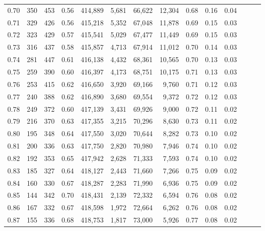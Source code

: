 \begin{tabular}{rrrrrrrrrrrrrr}
0.70 &     350 &    453 &  0.56 &  414,889 &    5,681 &  66,622 &  12,304 &  0.68 &  0.16 &      0.04 \\
0.71 &     329 &    426 &  0.56 &  415,218 &    5,352 &  67,048 &  11,878 &  0.69 &  0.15 &      0.03 \\
0.72 &     323 &    429 &  0.57 &  415,541 &    5,029 &  67,477 &  11,449 &  0.69 &  0.15 &      0.03 \\
0.73 &     316 &    437 &  0.58 &  415,857 &    4,713 &  67,914 &  11,012 &  0.70 &  0.14 &      0.03 \\
0.74 &     281 &    447 &  0.61 &  416,138 &    4,432 &  68,361 &  10,565 &  0.70 &  0.13 &      0.03 \\
0.75 &     259 &    390 &  0.60 &  416,397 &    4,173 &  68,751 &  10,175 &  0.71 &  0.13 &      0.03 \\
0.76 &     253 &    415 &  0.62 &  416,650 &    3,920 &  69,166 &   9,760 &  0.71 &  0.12 &      0.03 \\
0.77 &     240 &    388 &  0.62 &  416,890 &    3,680 &  69,554 &   9,372 &  0.72 &  0.12 &      0.03 \\
0.78 &     249 &    372 &  0.60 &  417,139 &    3,431 &  69,926 &   9,000 &  0.72 &  0.11 &      0.02 \\
0.79 &     216 &    370 &  0.63 &  417,355 &    3,215 &  70,296 &   8,630 &  0.73 &  0.11 &      0.02 \\
0.80 &     195 &    348 &  0.64 &  417,550 &    3,020 &  70,644 &   8,282 &  0.73 &  0.10 &      0.02 \\
0.81 &     200 &    336 &  0.63 &  417,750 &    2,820 &  70,980 &   7,946 &  0.74 &  0.10 &      0.02 \\
0.82 &     192 &    353 &  0.65 &  417,942 &    2,628 &  71,333 &   7,593 &  0.74 &  0.10 &      0.02 \\
0.83 &     185 &    327 &  0.64 &  418,127 &    2,443 &  71,660 &   7,266 &  0.75 &  0.09 &      0.02 \\
0.84 &     160 &    330 &  0.67 &  418,287 &    2,283 &  71,990 &   6,936 &  0.75 &  0.09 &      0.02 \\
0.85 &     144 &    342 &  0.70 &  418,431 &    2,139 &  72,332 &   6,594 &  0.76 &  0.08 &      0.02 \\
0.86 &     167 &    332 &  0.67 &  418,598 &    1,972 &  72,664 &   6,262 &  0.76 &  0.08 &      0.02 \\
0.87 &     155 &    336 &  0.68 &  418,753 &    1,817 &  73,000 &   5,926 &  0.77 &  0.08 &      0.02 \\

\end{tabular}
